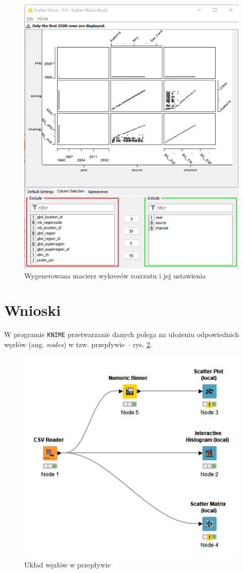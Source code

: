 \documentclass[11pt]{report}
\begin{document}
\begin{figure}[h]
    \centering
    \includegraphics[width=.8\textwidth]{scatter_matrix_2.png}
    \caption{Wygenerowana macierz wykresów rozrzutu i jej ustawienia\label{fig:scatter_matrix_2}}
\end{figure}

\chapter*{Wnioski}

W programie \texttt{KNIME} przetwarzanie danych polega na ułożeniu odpowiednich węzłów (ang. \textit{nodes}) w tzw. przepływie -- rys. \ref{fig:przestrzen_pracy}.

\begin{figure}[h]
    \centering
    \includegraphics[width=.8\textwidth]{przestrzen_pracy.png}
    \caption{Układ węzłów w przepływie\label{fig:przestrzen_pracy}}
\end{figure}
\end{document}
